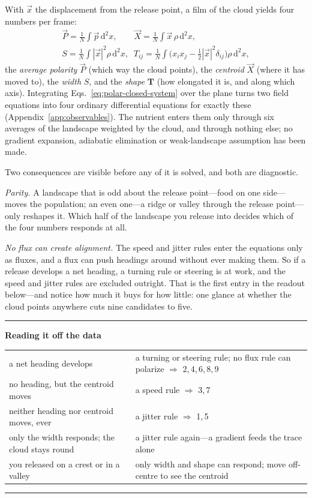 \documentclass[
  reprint,
  superscriptaddress,
  amsmath,
  amssymb,
  aps,
  pre,
  nofootinbib,
  floatfix
]{revtex4-2}
\makeatletter
\newcommand{\pv}{\vec p}
\newcommand{\dd}{\mathrm d}
\newcommand{\Pnet}{\vec P}
\newcommand{\Xc}{\vec X}
\newcommand{\Tsh}{\mathbf T}
\newenvironment{readout}
  {\par\addvspace{1.2ex}\noindent\rule{\columnwidth}{0.6pt}\par\nobreak
   \vspace{0.3ex}\noindent\textbf{Reading it off the data}\par\nobreak
   \vspace{0.4ex}\footnotesize\noindent
   \setlength{\parindent}{0pt}%
   \setlength{\emergencystretch}{3em}%
   \let\readout@restore\@arrayparboxrestore
   \def\@arrayparboxrestore{\readout@restore\raggedright\let\\\tabularnewline}%
   \begin{tabular}{@{}p{0.42\columnwidth}@{\hspace{0.9em}}p{0.50\columnwidth}@{}}}
  {\end{tabular}\par\nobreak\vspace{0.4ex}%
   \noindent\rule{\columnwidth}{0.6pt}\par\addvspace{1.0ex}}
\makeatother
\begin{document}
With $\vec x$ the displacement from the release point, a film of the cloud
yields four numbers per frame:
\begin{equation}
\begin{gathered}
 \Pnet=\frac1N\int\pv\,\dd^2x,
 \qquad
 \Xc=\frac1N\int\vec x\,\rho\,\dd^2x,\\
 S=\frac1N\int|\vec x|^{2}\rho\,\dd^2x,
 \;\;
 T_{ij}=\frac1N\int\bigl(x_ix_j-\tfrac12|\vec x|^{2}\delta_{ij}\bigr)\rho\,\dd^2x,
\end{gathered}
 \label{eq:observable-definitions}
\end{equation}
the \emph{average polarity} $\Pnet$ (which way the cloud points), the \emph{centroid}
$\Xc$ (where it has moved to), the \emph{width} $S$, and the \emph{shape}
$\Tsh$ (how elongated it is, and along which axis).  Integrating
Eqs.~\eqref{eq:polar-closed-system} over the plane turns two field equations
into four ordinary differential equations for exactly these
(Appendix~\ref{app:observables}).  The nutrient enters them only through six
averages of the landscape weighted by the cloud, and through nothing else; no
gradient expansion, adiabatic elimination or weak-landscape assumption has
been made.

Two consequences are visible before any of it is solved, and both are
diagnostic.

\emph{Parity.}  A landscape that is odd about the release point---food on one
side---moves the population; an even one---a ridge or valley through the
release point---only reshapes it.  Which half of the landscape you release
into decides which of the four numbers responds at all.

\emph{No flux can create alignment.}  The speed and jitter rules enter the
equations only as fluxes, and a flux can push headings around without ever
making them.  So if a release develops a net heading, a turning rule or
steering is at work, and the speed and jitter rules are excluded outright.
That is the first entry in the readout below---and notice how much it buys for
how little: one glance at whether the cloud points anywhere cuts nine
candidates to five.

\begin{readout}
a net heading develops & a turning or steering rule; no flux rule can polarize
$\Rightarrow$ 2,\,4,\,6,\,8,\,9\\[2pt]
no heading, but the centroid moves & a speed rule $\Rightarrow$ 3,\,7\\[2pt]
neither heading nor centroid moves, ever & a jitter rule $\Rightarrow$
1,\,5\\[2pt]
only the width responds; the cloud stays round & a jitter rule again---a
gradient feeds the trace alone\\[2pt]
you released on a crest or in a valley & only width and shape can
respond; move off-centre to see the centroid\\
\end{readout}
\end{document}
